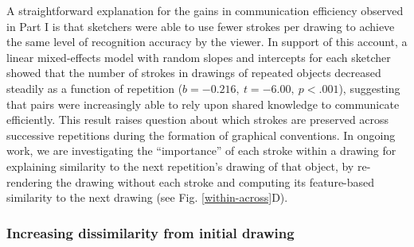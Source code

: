 \documentclass[10pt,letterpaper]{article}
\newcommand{\jefan}[1]{\textcolor{Blue}{jefan: #1}}
\begin{document}
A straightforward explanation for the gains in communication efficiency observed in Part I is that sketchers were able to use fewer strokes per drawing to achieve the same level of recognition accuracy by the viewer.
In support of this account, a linear mixed-effects model with random slopes and intercepts for each sketcher showed that the number of strokes in drawings of repeated objects decreased steadily as a function of repetition ($b = -0.216, ~t = -6.00, ~p < .001$), suggesting that pairs were increasingly able to rely upon shared knowledge to communicate efficiently. 
This result raises question about which strokes are preserved across successive repetitions during the formation of graphical conventions. 
In ongoing work, we are investigating the ``importance'' of each stroke within a drawing for explaining similarity to the next repetition's drawing of that object, by re-rendering the drawing without each stroke and computing its feature-based similarity to the next drawing (see Fig. \ref{within-across}D). 






\subsubsection{Increasing dissimilarity from initial drawing}
\end{document}
